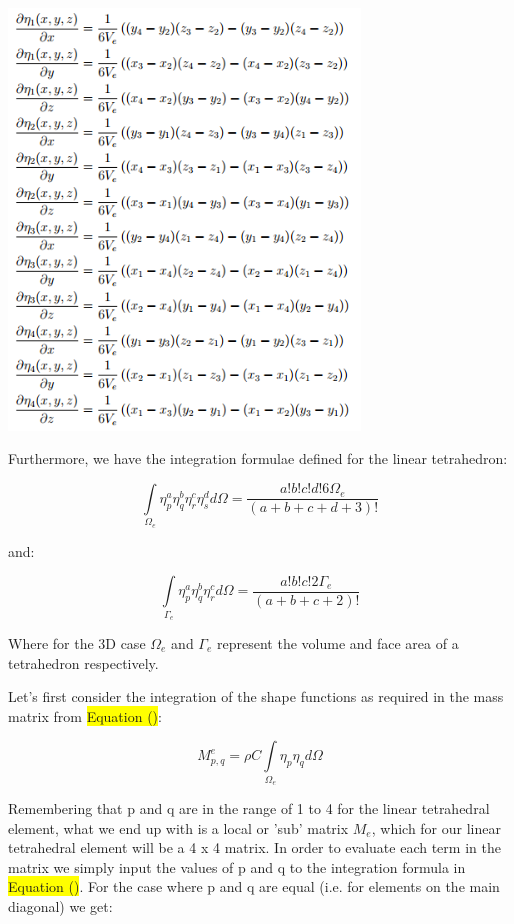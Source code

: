 \documentclass[12pt]{article}
\newcommand{\hilight}[1]{\colorbox{yellow}{#1}}
\begin{document}
\begin{center}
  \includegraphics[width=0.7\textwidth]{GradientShapeFunctions}
\end{center}

Furthermore, we have the integration formulae defined for the linear tetrahedron:

\begin{equation}
 \int\limits_{\Omega_e} \eta_p^a \eta_q^b \eta_r^c \eta_s^d d{\Omega}=
 \frac{a!b!c!d!6\Omega_e}{(a+b+c+d+3)!}
\end{equation}

and:

\begin{equation}
 \int\limits_{\Gamma_e} \eta_p^a \eta_q^b \eta_r^c  d{\Omega}=
 \frac{a!b!c!2\Gamma_e}{(a+b+c+2)!}
\end{equation}

Where for the 3D case $\Omega_e$ and $\Gamma_e$ represent the volume and face area of a tetrahedron respectively.

Let's first
consider the integration of the shape functions as required in the mass matrix from \hilight{Equation ()}:

$$
M_{p,q}^e = \rho C \int\limits_{\Omega_e} \eta_p \eta_q d\Omega
$$

Remembering that p and q are in the range of 1 to 4 for the linear tetrahedral element,
what we end up with is a local or 'sub' matrix $M_e$, which for our linear tetrahedral
element will be a 4 x 4 matrix. In order to evaluate each term in the matrix we
simply input the values of p and q to the integration formula in \hilight{Equation ()}. For
the case where p and q are equal (i.e. for elements on the main diagonal) we get:
\end{document}
